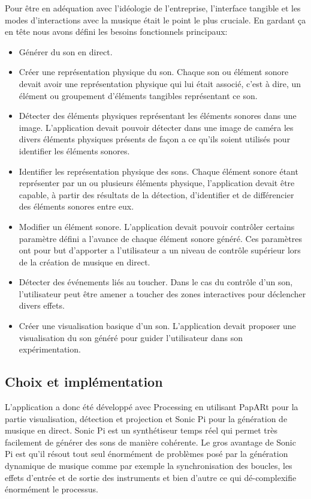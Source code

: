 Pour être en adéquation avec l'idéologie de l'entreprise, l'interface tangible et les modes d'interactions avec la musique était le point le plus cruciale. 
En gardant ça en tête nous avons défini les besoins fonctionnels principaux:
\begin{itemize}
\item Générer du son en direct.
\item Créer une représentation physique du son. Chaque son ou élément sonore devait avoir une représentation physique qui lui était associé, c'est à dire, un élément ou groupement d'éléments tangibles représentant ce son.
\item Détecter des éléments physiques représentant les éléments sonores dans une image. L'application devait pouvoir détecter dans une image de caméra les divers éléments physiques présents de façon a ce qu'ils soient utilisés pour identifier les éléments sonores.
\item Identifier les représentation physique des sons. Chaque élément sonore étant représenter par un ou plusieurs éléments physique, l'application devait être capable, à partir des résultats de la détection, d'identifier et de différencier des éléments sonores entre eux. 
\item Modifier un élément sonore. L'application devait pouvoir contrôler certains paramètre défini a l'avance de chaque élément sonore généré. Ces paramètres ont pour but d'apporter a l'utilisateur a un niveau de contrôle supérieur lors de la création de musique en direct.
\item Détecter des événements liés au toucher. Dans le cas du contrôle d'un son, l'utilisateur peut être amener a toucher des zones interactives pour déclencher divers effets.
\item Créer une visualisation basique d'un son. L'application devait proposer une visualisation du son généré pour guider l'utilisateur dans son expérimentation.
\end{itemize}

\subsection{Choix et implémentation}
\label{subsec:reartable:impl}
L'application a donc été développé avec Processing en utilisant PapARt pour la partie visualisation, détection et projection et Sonic Pi\cite{sonicpi} pour la génération de musique en direct.
Sonic Pi est un synthétiseur temps réel qui permet très facilement de générer des sons de manière cohérente. Le gros avantage de Sonic Pi est qu'il résout tout seul énormément de problèmes posé par la génération dynamique de musique comme par exemple la synchronisation des boucles, les effets d'entrée et de sortie des instruments et bien d'autre ce qui dé-complexifie énormément le processus.

